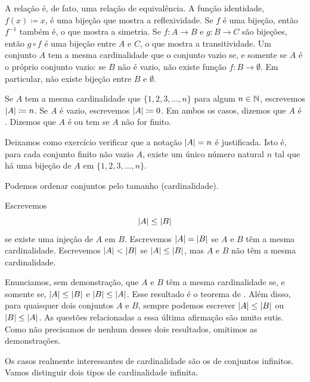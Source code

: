 A relação  é, de fato, uma relação de
equivalência.
A função identidade, $f(x) \coloneqq x$, é uma bijeção que mostra a
reflexividade.
Se $f$ é uma bijeção, então $f^{-1}$ também é, o que mostra a simetria.
Se $f \colon A \to B$ e $g \colon B \to C$ são bijeções, então
$g \circ f$ é uma bijeção entre $A$ e $C$, o que mostra a transitividade.
Um conjunto $A$ tem a mesma cardinalidade que o conjunto vazio se, e somente
se $A$ é o próprio conjunto vazio: se $B$ não é vazio, não existe função
$f \colon B \to \emptyset$.
Em particular, não existe bijeção entre $B$ e $\emptyset$.

\begin{defn}
Se $A$ tem a mesma cardinalidade que $\{ 1,2,3,\ldots,n \}$
para algum $n \in {\mathbb{N}}$,
escrevemos $\lvert {A} \rvert \coloneqq n$. Se $A$ é vazio, escrevemos
$\lvert {A} \rvert \coloneqq 0$.
Em ambos os casos, dizemos que $A$ é
\emph{}.
Dizemos que $A$ é \emph{} ou tem
 se $A$ não for finito.
\end{defn}

Deixamos como exercício verificar que a notação $\lvert {A} \rvert = n$ é justificada.
Isto é, para cada conjunto finito não vazio $A$, existe um único número
natural $n$ tal que há uma bijeção de $A$ em $\{ 1,2,3,\ldots,n \}$.

Podemos ordenar conjuntos pelo tamanho (cardinalidade).

\begin{defn} \label{def:comparecards}
Escrevemos
\begin{equation*}
\lvert {A} \rvert \leq \lvert {B} \rvert
\end{equation*}
se existe uma injeção de $A$ em $B$. Escrevemos $\lvert {A} \rvert = \lvert {B} \rvert$
se $A$ e $B$ têm a mesma cardinalidade. Escrevemos $\lvert {A} \rvert < \lvert {B} \rvert$
se $\lvert {A} \rvert \leq \lvert {B} \rvert$, mas $A$ e $B$ não têm a mesma cardinalidade.
\end{defn}

Enunciamos, sem demonstração, que
$A$ e $B$ têm a mesma cardinalidade se, e somente se,
$\lvert {A} \rvert \leq \lvert {B} \rvert$ e
$\lvert {B} \rvert \leq \lvert {A} \rvert$. Esse resultado é o teorema de
.
Além disso, para quaisquer dois conjuntos $A$ e $B$,
sempre podemos escrever $\lvert {A} \rvert \leq \lvert {B} \rvert$ ou
$\lvert {B} \rvert \leq \lvert {A} \rvert$. As questões relacionadas a essa
última afirmação são muito sutis. Como não precisamos de nenhum
desses dois resultados, omitimos as demonstrações.

Os casos realmente interessantes de cardinalidade são os de conjuntos
infinitos.
Vamos distinguir dois tipos de cardinalidade infinita.

